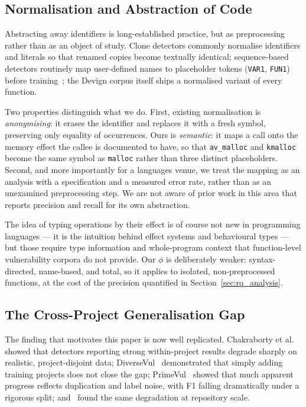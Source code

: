 \subsection{Normalisation and Abstraction of Code}
Abstracting away identifiers is long-established practice, but as
preprocessing rather than as an object of study. Clone detectors commonly normalise
identifiers and literals so that renamed copies become textually identical;
sequence-based detectors routinely map
user-defined names to placeholder tokens (\texttt{VAR1}, \texttt{FUN1}) before
training~\cite{li2018vuldeepecker, li2022sysevr}; the Devign corpus itself
ships a normalised variant of every function.

Two properties distinguish what we do. First, existing normalisation is
\emph{anonymising}: it erases the identifier and replaces it with a fresh
symbol, preserving only equality of occurrences. Ours is \emph{semantic}: it
maps a call onto the memory effect the callee is documented to have, so that
\texttt{av\_malloc} and \texttt{kmalloc} become the same symbol as
\texttt{malloc} rather than three distinct placeholders. Second, and more
importantly for a languages venue, we treat the mapping as an analysis with a
specification and a measured error rate, rather than as an unexamined
preprocessing step. We are not aware of prior work in this area that reports
precision and recall for its own abstraction.

The idea of typing operations by their effect is of course not new in
programming languages --- it is the intuition behind effect systems and behavioural
types --- but those require type information and whole-program context that
function-level vulnerability corpora do not provide. Our $\phi$ is deliberately
weaker: syntax-directed, name-based, and total, so it applies to isolated,
non-preprocessed functions, at the cost of the precision quantified in
Section~\ref{sec:rq_analysis}.

\subsection{The Cross-Project Generalisation Gap}
The finding that motivates this paper is now well replicated. Chakraborty et
al.~\cite{chakraborty2022deep} showed that detectors reporting strong
within-project results degrade sharply on realistic, project-disjoint data;
DiverseVul~\cite{chen2023diversevul} demonstrated that simply adding training
projects does not close the gap; PrimeVul~\cite{ding2025primevul} showed that
much apparent progress reflects duplication and label noise, with F1 falling
dramatically under a rigorous split; and~\cite{chakraborty2024realvul} found
the same degradation at repository scale.

